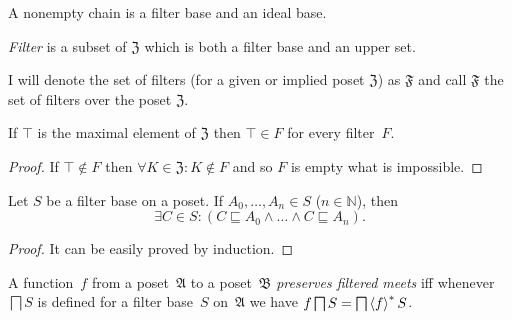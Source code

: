 \begin{obvious}
A nonempty chain is a filter base and an ideal base.\end{obvious}
\begin{defn}
\emph{Filter} is a subset of $\mathfrak{Z}$
which is both a filter base and an upper set.
\end{defn}
I will denote the set of filters (for a given or implied poset $\mathfrak{Z}$)
as $\mathfrak{F}$ and call $\mathfrak{F}$ the set of filters over
the poset $\mathfrak{Z}$.
\begin{prop}
If $\top$ is the maximal element of $\mathfrak{Z}$ then $\top\in F$
for every filter~$F$.\end{prop}
\begin{proof}
If $\top\notin F$ then $\forall K\in\mathfrak{Z}:K\notin F$ and
so $F$ is empty what is impossible.\end{proof}
\begin{prop}
Let $S$ be a filter base on a poset. If $A_{0},\ldots,A_{n}\in S$
($n\in\mathbb{N}$), then
\[
\exists C\in S:(C\sqsubseteq A_{0}\land\ldots\land C\sqsubseteq A_{n}).
\]
\end{prop}
\begin{proof}
It can be easily proved by induction.\end{proof}
\begin{defn}
A function~$f$ from a poset~$\mathfrak{A}$ to a poset~$\mathfrak{B}$
\emph{preserves filtered meets} iff whenever $\bigsqcap S$ is defined
for a filter base~$S$ on~$\mathfrak{A}$ we have $f\bigsqcap S=\bigsqcap\left\langle f\right\rangle ^{\ast}S$.
\end{defn}

